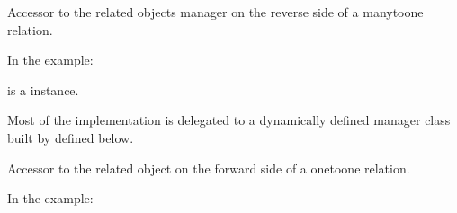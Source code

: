 \documentclass[letterpaper,10pt,french]{sphinxmanual}
\begin{document}
\begin{fulllineitems}
\begin{fulllineitems}
\label{\detokenize{main/model:main.models.Enseignant.matiere_set}}
\pysigstartsignatures
{}
\pysigstopsignatures
\sphinxAtStartPar
Accessor to the related objects manager on the reverse side of a
many\sphinxhyphen{}to\sphinxhyphen{}one relation.

\sphinxAtStartPar
In the example:

\begin{sphinxVerbatim}[commandchars=\\\{\}]
 
       
\end{sphinxVerbatim}

\sphinxAtStartPar
{} is a  instance.

\sphinxAtStartPar
Most of the implementation is delegated to a dynamically defined manager
class built by  defined below.

\end{fulllineitems}


\begin{fulllineitems}
\label{\detokenize{main/model:main.models.Enseignant.niveaux}}
\pysigstartsignatures
{}
\pysigstopsignatures
\end{fulllineitems}


\begin{fulllineitems}
\label{\detokenize{main/model:main.models.Enseignant.personnel_ptr}}
\pysigstartsignatures
{}
\pysigstopsignatures
\sphinxAtStartPar
Accessor to the related object on the forward side of a one\sphinxhyphen{}to\sphinxhyphen{}one relation.

\sphinxAtStartPar
In the example:


\end{fulllineitems}
\end{fulllineitems}
\end{document}
